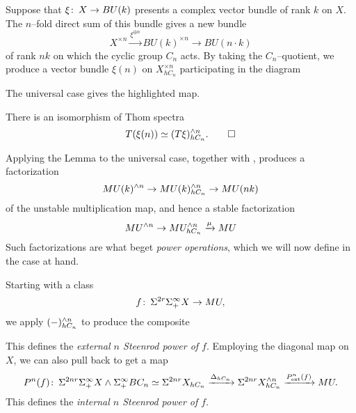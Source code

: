 \begin{definition}
Suppose that $\xi\colon\thinspace X \to BU(k)$ presents a complex vector bundle of rank $k$ on $X$.  The $n$--fold direct sum of this bundle gives a new bundle \[X^{\times n} \xrightarrow{\xi^{\oplus n}} BU(k)^{\times n} \to BU(n \cdot k)\] of rank $nk$ on which the cyclic group $C_n$ acts.  By taking the $C_n$--quotient, we produce a vector bundle $\xi(n)$ on $X^{\times n}_{hC_n}$ participating in the diagram
\begin{center}
\end{center}
The universal case gives the highlighted map.
\end{definition}

\begin{lemma}
There is an isomorphism of Thom spectra \[T(\xi(n)) \simeq (T\xi)^{\wedge n}_{hC_n}. \qed\]
\end{lemma}

Applying the Lemma to the universal case, together with , produces a factorization \[MU(k)^{\wedge n} \to MU(k)^{\wedge n}_{hC_n} \to MU(nk)\] of the unstable multiplication map, and hence a stable factorization \[MU^{\wedge n} \to MU^{\wedge n}_{hC_n} \xrightarrow{\mu} MU\]  Such factorizations are what beget \textit{power operations}, which we will now define in the case at hand.

\begin{definition}
Starting with a class \[f\colon\thinspace \Sigma^{2r} \Sigma^\infty_+ X \to MU,\] we apply $(-)^{\wedge n}_{hC_n}$ to produce the composite
\begin{center}
\end{center}
This defines the \textit{external $n${\th} Steenrod power of $f$}.  Employing the diagonal map on $X$, we can also pull back to get a map \[P^n(f)\colon\thinspace \Sigma^{2nr} \Sigma^\infty_+ X \wedge \Sigma^\infty_+ BC_n \simeq \Sigma^{2nr} X_{hC_n} \xrightarrow{\Delta_{hC_n}} \Sigma^{2nr} X^{\wedge n}_{hC_n} \xrightarrow{P^n_{\mathrm{ext}}(f)} MU.\]  This defines the \textit{internal $n${\th} Steenrod power of $f$}.
\end{definition}


